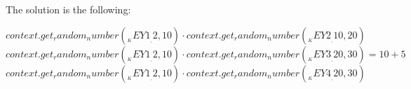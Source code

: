 The solution is the following:
\begin{Solution}
\solitem ${{context.get_random_number(__KEY1__, 2, 10)}} \cdot {{context.get_random_number(__KEY2__, 10, 20)}}$
\solitem ${{context.get_random_number(__KEY1__, 2, 10)}} \cdot {{context.get_random_number(__KEY3__, 20, 30)}} = {{10+5}}$ 
\solitem ${{context.get_random_number(__KEY1__, 2, 10)}} \cdot {{context.get_random_number(__KEY4__, 20, 30)}}$ 
\end{Solution}